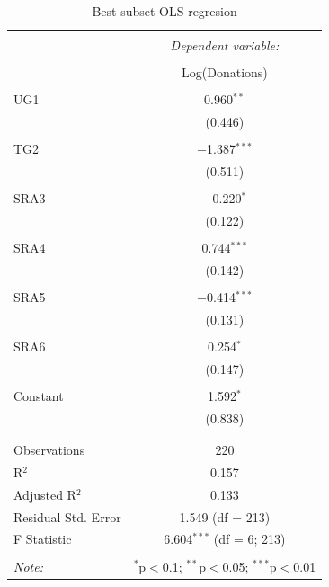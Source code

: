 \documentclass[12pt]{article}
\begin{document}
\begin{table}[!htbp] \centering 
  \caption{Best-subset OLS regresion} 
  \label{} 
\begin{tabular}{@{\extracolsep{5pt}}lc} 
\\[-1.8ex]\hline 
\hline \\[-1.8ex] 
 & \multicolumn{1}{c}{\textit{Dependent variable:}} \\ 
\cline{2-2} 
\\[-1.8ex] & Log(Donations) \\ 
\hline \\[-1.8ex] 
 UG1 & 0.960$^{**}$ \\ 
  & (0.446) \\ 
  & \\ 
 TG2 & $-$1.387$^{***}$ \\ 
  & (0.511) \\ 
  & \\ 
 SRA3 & $-$0.220$^{*}$ \\ 
  & (0.122) \\ 
  & \\ 
 SRA4 & 0.744$^{***}$ \\ 
  & (0.142) \\ 
  & \\ 
 SRA5 & $-$0.414$^{***}$ \\ 
  & (0.131) \\ 
  & \\ 
 SRA6 & 0.254$^{*}$ \\ 
  & (0.147) \\ 
  & \\ 
 Constant & 1.592$^{*}$ \\ 
  & (0.838) \\ 
  & \\ 
\hline \\[-1.8ex] 
Observations & 220 \\ 
R$^{2}$ & 0.157 \\ 
Adjusted R$^{2}$ & 0.133 \\ 
Residual Std. Error & 1.549 (df = 213) \\ 
F Statistic & 6.604$^{***}$ (df = 6; 213) \\ 
\hline 
\hline \\[-1.8ex] 
\textit{Note:}  & \multicolumn{1}{r}{$^{*}$p$<$0.1; $^{**}$p$<$0.05; $^{***}$p$<$0.01} \\ 
\end{tabular} 
\end{table} 
\end{document}

